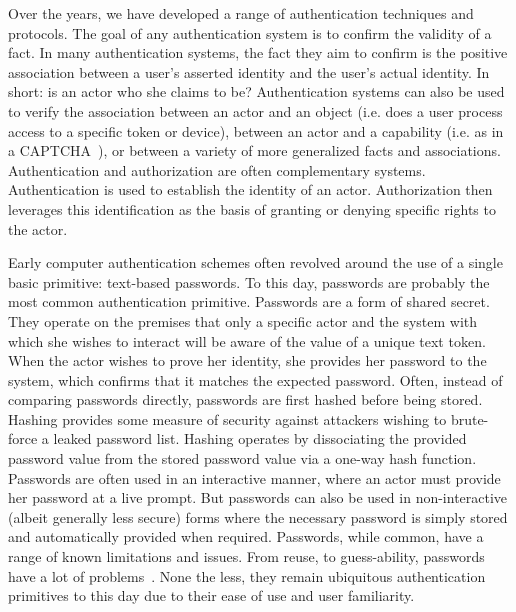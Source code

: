 Over the years, we have developed a range of authentication techniques
and protocols. The goal of any authentication system is to confirm the
validity of a fact. In many authentication systems, the fact they aim
to confirm is the positive association between a user's asserted
identity and the user's actual identity. In short: is an actor who she
claims to be? Authentication systems can also be used to verify the
association between an actor and an object (i.e. does a user process
access to a specific token or device), between an actor and a
capability (i.e. as in a CAPTCHA~\cite{captcha}), or between a variety
of more generalized facts and associations. Authentication and
authorization are often complementary systems. Authentication is used
to establish the identity of an actor. Authorization then leverages
this identification as the basis of granting or denying specific
rights to the actor.

Early computer authentication schemes often revolved around the use of
a single basic primitive: text-based passwords. To this day, passwords
are probably the most common authentication primitive. Passwords are a
form of shared secret. They operate on the premises that only a
specific actor and the system with which she wishes to interact will
be aware of the value of a unique text token. When the actor wishes to
prove her identity, she provides her password to the system, which
confirms that it matches the expected password. Often, instead of
comparing passwords directly, passwords are first hashed before being
stored. Hashing provides some measure of security against attackers
wishing to brute-force a leaked password list. Hashing operates by
dissociating the provided password value from the stored password
value via a one-way hash function. Passwords are often used in an
interactive manner, where an actor must provide her password at a live
prompt. But passwords can also be used in non-interactive (albeit
generally less secure) forms where the necessary password is simply
stored and automatically provided when required. Passwords, while
common, have a range of known limitations and issues. From reuse, to
guess-ability, passwords have a lot of
problems~\cite{goodin-passwords, goodin-bible, Mazurek2013,
  Singer2013}. None the less, they remain ubiquitous authentication
primitives to this day due to their ease of use and user familiarity.

